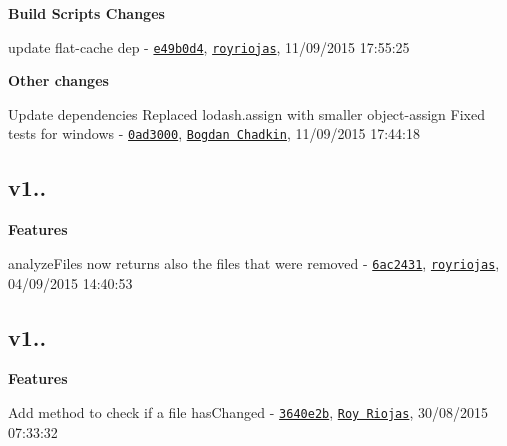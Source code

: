 \begin{DoxyItemize}
\item {\bfseries Build Scripts Changes}
\begin{DoxyItemize}
\item update flat-\/cache dep -\/ \href{https://github.com/royriojas/file-entry-cache/commit/e49b0d4}{\tt e49b0d4}, \href{https://github.com/royriojas}{\tt royriojas}, 11/09/2015 17\+:55\+:25
\end{DoxyItemize}
\item {\bfseries Other changes}
\begin{DoxyItemize}
\item Update dependencies Replaced lodash.\+assign with smaller object-\/assign Fixed tests for windows -\/ \href{https://github.com/royriojas/file-entry-cache/commit/0ad3000}{\tt 0ad3000}, \href{https://github.com/Bogdan Chadkin}{\tt Bogdan Chadkin}, 11/09/2015 17\+:44\+:18
\end{DoxyItemize}
\end{DoxyItemize}

\subsection*{v1..}


\begin{DoxyItemize}
\item {\bfseries Features}
\begin{DoxyItemize}
\item analyze\+Files now returns also the files that were removed -\/ \href{https://github.com/royriojas/file-entry-cache/commit/6ac2431}{\tt 6ac2431}, \href{https://github.com/royriojas}{\tt royriojas}, 04/09/2015 14\+:40\+:53
\end{DoxyItemize}
\end{DoxyItemize}

\subsection*{v1..}


\begin{DoxyItemize}
\item {\bfseries Features}
\begin{DoxyItemize}
\item Add method to check if a file has\+Changed -\/ \href{https://github.com/royriojas/file-entry-cache/commit/3640e2b}{\tt 3640e2b}, \href{https://github.com/Roy Riojas}{\tt Roy Riojas}, 30/08/2015 07\+:33\+:32
\end{DoxyItemize}
\end{DoxyItemize}

